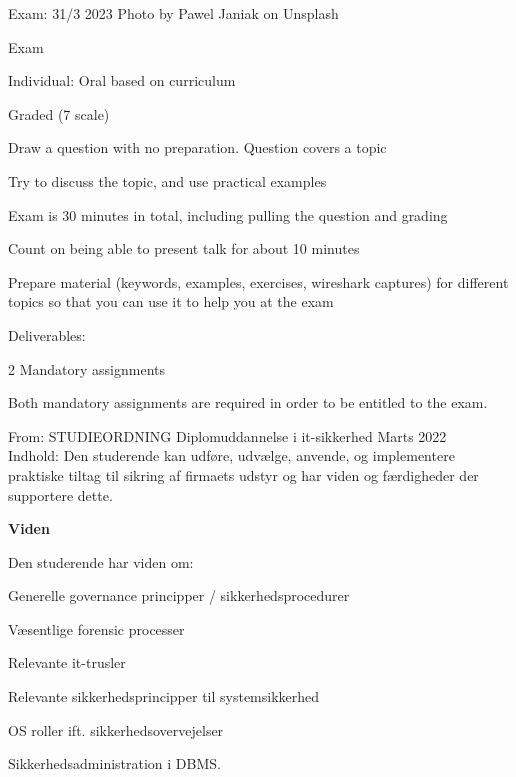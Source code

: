 \documentclass[Screen16to9,17pt]{foils}
\begin{document}
Exam: 31/3 2023 \hskip 12cm Photo by Pawel Janiak on Unsplash


\begin{list2}
\item Exam
\item Individual: Oral based on curriculum
\item Graded (7 scale)
\item Draw a question with no preparation. Question covers a topic
\item Try to discuss the topic, and use practical examples
\item Exam is 30 minutes in total, including pulling the question and grading
\item Count on being able to present talk for about 10 minutes
\item Prepare material (keywords, examples, exercises, wireshark captures) for different topics so that you can use it to help you at the exam

\vskip 5mm
\item Deliverables:
\item 2 Mandatory assignments
\item Both mandatory assignments are required in order to be entitled to the exam.
\end{list2}



From: STUDIEORDNING Diplomuddannelse i it-sikkerhed Marts 2022\\
Indhold: Den studerende kan udføre, udvælge, anvende, og implementere praktiske
tiltag til sikring af firmaets udstyr og har viden og færdigheder der supportere dette.

{\bf Viden}

Den studerende har viden om:
\begin{list2}
\item Generelle governance principper / sikkerhedsprocedurer
\item Væsentlige forensic processer
\item Relevante it-trusler
\item Relevante sikkerhedsprincipper til systemsikkerhed
\item OS roller ift. sikkerhedsovervejelser
\item Sikkerhedsadministration i DBMS.
\end{list2}

\end{document}
